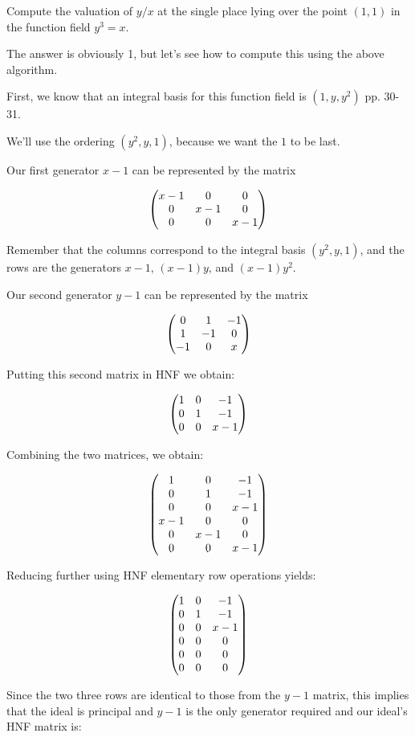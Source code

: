 \begin{example}
Compute the valuation of $y/x$ at the single place lying over the point $(1,1)$ in the function field $y^3=x$.

The answer is obviously 1, but let's see how to compute this using the above algorithm.

First, we know that an integral basis for this function field is $(1,y,y^2)$ \cite{trager} pp. 30-31.

We'll use the ordering $(y^2,y,1)$, because we want the $1$ to be last.

Our first generator $x-1$ can be represented by the matrix

\[
\left(\begin{matrix}
 x-1 & 0 & 0 \cr
 0 & x-1 & 0 \cr
 0 & 0 & x-1 \cr
\end{matrix}\right)
\]

Remember that the columns correspond to the integral basis $(y^2,y,1)$, and the rows are
the generators $x-1$, $(x-1)y$, and $(x-1)y^2$.

Our second generator $y-1$ can be represented by the matrix

\[
\left(\begin{matrix}
 0 & 1 & -1 \cr
 1 & -1 & 0 \cr
 -1 & 0 & x \cr
\end{matrix}\right)
\]

Putting this second matrix in HNF we obtain:

\[
\left(\begin{matrix}
 1 & 0 & -1 \cr
 0 & 1 & -1 \cr
 0 & 0 & x-1 \cr
\end{matrix}\right)
\]

Combining the two matrices, we obtain:

\[
\left(\begin{matrix}
 1 & 0 & -1 \cr
 0 & 1 & -1 \cr
 0 & 0 & x-1 \cr
 x-1 & 0 & 0 \cr
 0 & x-1 & 0 \cr
 0 & 0 & x-1 \cr
\end{matrix}\right)
\]

Reducing further using HNF elementary row operations yields:

\[
\left(\begin{matrix}
 1 & 0 & -1 \cr
 0 & 1 & -1 \cr
 0 & 0 & x-1 \cr
 0 & 0 & 0 \cr
 0 & 0 & 0 \cr
 0 & 0 & 0 \cr
\end{matrix}\right)
\]

Since the two three rows are identical to those from the $y-1$ matrix,
this implies that the ideal is principal and $y-1$ is the only generator required
and our ideal's HNF matrix is:


\end{example}
